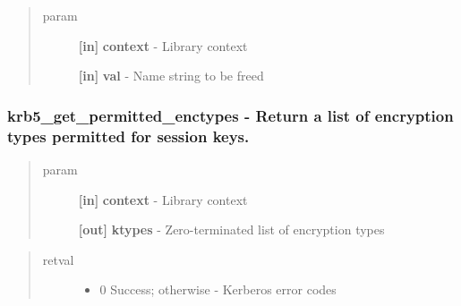 \documentclass[letterpaper,10pt,english]{sphinxmanual}
\begin{document}
\begin{quote}\begin{description}
\item[{param}] \leavevmode
\textbf{{[}in{]}} \textbf{context} - Library context

\textbf{{[}in{]}} \textbf{val} - Name string to be freed

\end{description}\end{quote}


\subsubsection{krb5\_get\_permitted\_enctypes -  Return a list of encryption types permitted for session keys.}
\label{appdev/refs/api/krb5_get_permitted_enctypes:krb5-get-permitted-enctypes-return-a-list-of-encryption-types-permitted-for-session-keys}\label{appdev/refs/api/krb5_get_permitted_enctypes::doc}

\begin{fulllineitems}
\label{appdev/refs/api/krb5_get_permitted_enctypes:krb5_get_permitted_enctypes}
\end{fulllineitems}

\begin{quote}\begin{description}
\item[{param}] \leavevmode
\textbf{{[}in{]}} \textbf{context} - Library context

\textbf{{[}out{]}} \textbf{ktypes} - Zero-terminated list of encryption types

\end{description}\end{quote}
\begin{quote}\begin{description}
\item[{retval}] \leavevmode\begin{itemize}
\item {} 
0   Success; otherwise - Kerberos error codes

\end{itemize}

\end{description}\end{quote}
\end{document}
